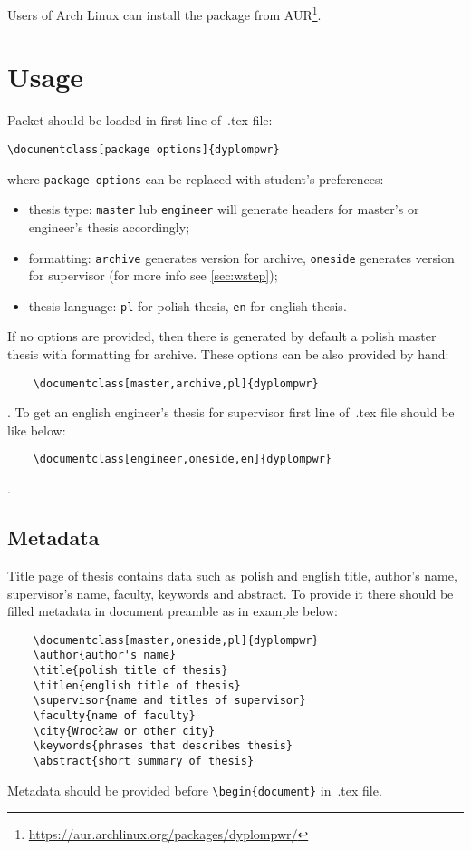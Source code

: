 \documentclass[12pt,a4paper]{article}
\begin{document}
Users of Arch Linux can install the package from
AUR\footnote{\url{https://aur.archlinux.org/packages/dyplompwr/}}.

\section{Usage}
\par Packet should be loaded in first line of~.tex file:
\begin{verbatim}
\documentclass[package options]{dyplompwr}
\end{verbatim}
where \verb|package options| can be replaced with student's preferences:
\begin{itemize}
    \item thesis type: \verb|master| lub \verb|engineer| will generate
        headers for master's or engineer's thesis accordingly;
    \item formatting: \verb|archive| generates version for archive,
        \verb|oneside| generates version for supervisor (for more info see
        \cref{sec:wstep});
    \item thesis language: \verb|pl| for polish thesis, \verb|en| for english thesis.
\end{itemize}
If no options are provided, then there is generated by default a polish master thesis with formatting for archive.
These options can be also provided by hand:
\begin{verbatim}
    \documentclass[master,archive,pl]{dyplompwr}
\end{verbatim}.
To get an english engineer's thesis for supervisor first line of~.tex file
should be like below:
\begin{verbatim}
    \documentclass[engineer,oneside,en]{dyplompwr}
\end{verbatim}.
\subsection{Metadata}
Title page of thesis contains data such as polish and english title, author's
name, supervisor's name, faculty, keywords and abstract. To provide it there
should be filled metadata in document preamble as in example below:
\begin{verbatim}
    \documentclass[master,oneside,pl]{dyplompwr}
    \author{author's name}
    \title{polish title of thesis}
    \titlen{english title of thesis}
    \supervisor{name and titles of supervisor}
    \faculty{name of faculty}
    \city{Wrocław or other city}
    \keywords{phrases that describes thesis}
    \abstract{short summary of thesis}
\end{verbatim}
Metadata should be provided before \verb|\begin{document}| in~.tex file.
\end{document}

